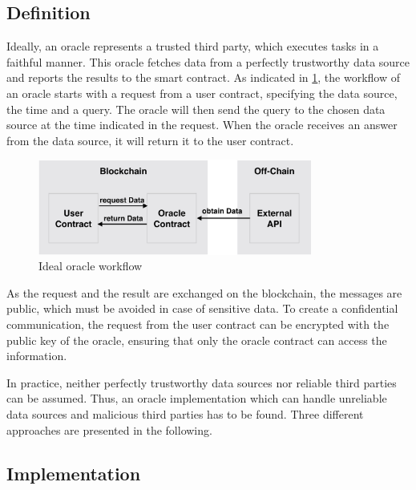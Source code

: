 \documentclass[conference]{IEEEtran}
\begin{document}
\subsection{Definition}
Ideally, an oracle represents a trusted third party, which executes tasks in a faithful manner. This oracle fetches data from a perfectly trustworthy data source and reports the results to the smart contract. As indicated in \ref{idealOracle}, the workflow of an oracle starts with a request from a user contract, specifying the data source, the time and a query. The oracle will then send the query to the chosen data source at the time indicated in the request. When the oracle receives an answer from the data source, it will return it to the user contract. \cite{Ellis2017} \par 
\begin{figure}[h]
	\begin{center}
		\includegraphics[width=9cm]{idealOracle.png}
		\caption{Ideal oracle workflow}
		\label{idealOracle}
	\end{center}
\end{figure} 
As the request and the result are exchanged on the blockchain, the messages are public, which must be avoided in case of sensitive data. To create a confidential communication, the request from the user contract can be encrypted with the public key of the oracle, ensuring that only the oracle contract can access the information. \cite{Ellis2017} \par
In practice, neither perfectly trustworthy data sources nor reliable third parties can be assumed. Thus, an oracle implementation which can handle unreliable data sources and malicious third parties has to be found. Three different approaches are presented in the following. \cite{Mik2017} 
\subsection{Implementation}
\end{document}
